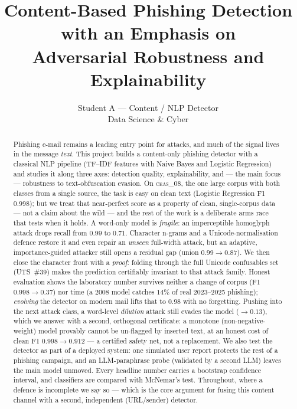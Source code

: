 \documentclass[11pt]{article}
\title{\textbf{Content-Based Phishing Detection with an Emphasis on\\
Adversarial Robustness and Explainability}}
\author{Student A --- Content / NLP Detector\\
\small Data Science \& Cyber}
\date{}
\begin{document}
\maketitle

\begin{abstract}
\noindent
Phishing e-mail remains a leading entry point for attacks, and much of the signal lives
in the message \emph{text}. This project builds a content-only phishing detector with a
classical NLP pipeline (TF--IDF features with Naive Bayes and Logistic Regression) and
studies it along three axes: detection quality, explainability, and --- the main focus ---
robustness to text-obfuscation evasion. On \textsc{ceas\_08}, the one large corpus with
both classes from a single source, the task is easy on clean text (Logistic Regression F1
$0.998$); but we treat that near-perfect score as a property of clean, single-corpus data
--- not a claim about the wild --- and the rest of the work is a deliberate arms race that
tests when it holds. A word-only model is \emph{fragile}: an imperceptible homoglyph attack
drops recall from $0.99$ to $0.71$. Character n-grams and a Unicode-normalisation defence
restore it and even repair an \emph{unseen} full-width attack, but an adaptive,
importance-guided attacker still opens a residual gap (union $0.99\rightarrow0.87$). We then
close the character front with a \emph{proof}: folding through the full Unicode confusables
set (UTS~\#39) makes the prediction certifiably invariant to that attack family. Honest
evaluation shows the laboratory number survives neither a change of corpus (F1
$0.998\rightarrow0.37$) nor time (a 2008 model catches $14\%$ of real 2023--2025 phishing);
\emph{evolving} the detector on modern mail lifts that to $0.98$ with no forgetting. Pushing
into the next attack class, a word-level \emph{dilution} attack still evades the model
($\rightarrow0.13$), which we answer with a second, orthogonal certificate: a monotone
(non-negative-weight) model provably cannot be un-flagged by inserted text, at an honest
cost of clean F1 $0.998\rightarrow0.912$ --- a certified safety net, not a replacement. We
also test the detector as part of a deployed system: one simulated user report protects the
rest of a phishing campaign, and an LLM-paraphrase probe (validated by a second LLM) leaves
the main model unmoved. Every headline number carries a bootstrap confidence interval, and
classifiers are compared with McNemar's test. Throughout, where a defence is incomplete we
say so --- which is the core argument for fusing this content channel with a second,
independent (URL/sender) detector.
\end{abstract}
\end{document}
